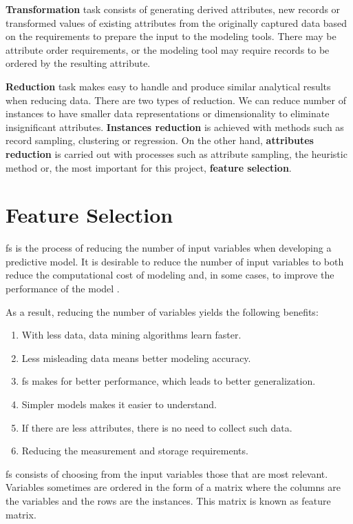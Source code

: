 \textbf{Transformation} task consists of generating derived attributes, new records or transformed values of existing attributes from the originally captured data based on the requirements to prepare the input to the modeling tools. There may be attribute order requirements, or the modeling tool may require records to be ordered by the resulting attribute.

\textbf{Reduction} task makes easy to handle and produce similar analytical results when reducing data. There are two types of reduction. We can reduce number of instances to have smaller data representations or dimensionality to eliminate insignificant attributes. \textbf{Instances reduction} is achieved with methods such as record sampling, clustering or regression. On the other hand, \textbf{attributes reduction} is carried out with processes such as attribute sampling, the heuristic method or, the most important for this project, \textbf{feature selection}.

\section{Feature Selection}
\label{sec:feature-selection}

\acrfull{fs} is the process of reducing the number of input variables when developing a predictive model. It is desirable to reduce the number of input variables to both reduce the computational cost of modeling and, in some cases, to improve the performance of the model \cite{fs-method-ml}.

As a result, reducing the number of variables yields the following benefits:
\begin{enumerate}
    \item With less data, data mining algorithms learn faster.
    \item Less misleading data means better modeling accuracy.
    \item \acrshort{fs} makes for better performance, which leads to better generalization.
    \item Simpler models makes it easier to understand.
    \item If there are less attributes, there is no need to collect such data.
    \item Reducing the measurement and storage requirements.
\end{enumerate}

\acrshort{fs} consists of choosing from the input variables those that are most relevant. Variables sometimes are ordered in the form of a matrix where the columns are the variables and the rows are the instances. This matrix is known as feature matrix.

